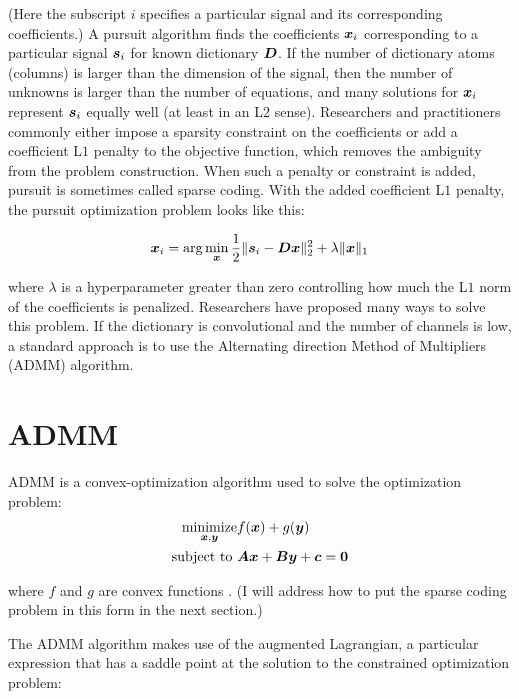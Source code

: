 (Here the subscript $i$ specifies a particular signal and its corresponding coefficients.) A pursuit algorithm finds the coefficients $\bm{x}_i$ corresponding to a particular signal $\bm{s}_i$ for known dictionary $\bm{D}$. If the number of dictionary atoms (columns) is larger than the dimension of the signal, then the number of unknowns is larger than the number of equations, and many solutions for $\bm{x}_i$ represent $\bm{s}_i$ equally well (at least in an L$2$ sense). Researchers and practitioners commonly either impose a sparsity constraint on the coefficients or add a coefficient L$1$ penalty to the objective function, which removes the ambiguity from the problem construction. When such a penalty or constraint is added, pursuit is sometimes called sparse coding. With the added coefficient L$1$ penalty, the pursuit optimization problem looks like this:

\begin{equation}\label{equation:sparse coding}
\bm{x}_i = \arg\min_{\bm{x}} \frac{1}{2}\|\bm{s}_i - \bm{D}\bm{x}\|_2^2 + \lambda \|\bm{x}\|_1
\end{equation}

where $\lambda$ is a hyperparameter greater than zero controlling how much the L$1$ norm of the coefficients is penalized. Researchers have proposed many ways to solve this problem. If the dictionary is convolutional and the number of channels is low, a standard approach is to use the Alternating direction Method of Multipliers (ADMM) algorithm.

\section{ADMM}
\label{section:ADMM}
ADMM is a convex-optimization algorithm used to solve the optimization problem:
\begin{equation} \label{equation:ADMM}
\begin{aligned}
\operatorname*{\text{minimize}}_{\bm{x},\bm{y}} & f(\bm{x}) + g(\bm{y}) \\
\text{subject to } & \bm{A}\bm{x} + \bm{B}\bm{y} + \bm{c} = \bm{0} 
\end{aligned}
\end{equation}

where $f$ and $g$ are convex functions \cite{boyd2011distributed}. (I will address how to put the sparse coding problem in this form in the next section.)

The ADMM algorithm makes use of the augmented Lagrangian, a particular expression that has a saddle point at the solution to the constrained optimization problem:

